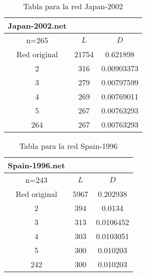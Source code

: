 \begin{minipage}{0.5\textwidth}
  \begin{table}[H]
    \caption{Tabla para la red Japan-2002}
    \begin{tabular}{ccc}
      Japan-2002.net & & \\
      \hline
      n=265              &   $L$ &   $D$ \\
      \hline
      Red original &               21754 & 0.621898   \\
      2            &                 316 & 0.00903373 \\
      3            &                 279 & 0.00797599 \\
      4            &                 269 & 0.00769011 \\
      5            &                 267 & 0.00763293 \\
      264          &                 267 & 0.00763293 \\
      \hline
    \end{tabular}
    \label{jap}
  \end{table}
\end{minipage}
\begin{minipage}{0.5\textwidth}
  \begin{table}[H]
    \caption{Tabla para la red Spain-1996}
    \begin{tabular}{ccc}
      Spain-1996.net & & \\
      \hline
      n=243              &   $L$ &   $D$ \\
      \hline
      Red original &                5967 &  0.202938  \\
      2            &                 394 &  0.0134    \\
      3            &                 313 &  0.0106452 \\
      4            &                 303 &  0.0103051 \\
      5            &                 300 &  0.010203  \\
      242          &                 300 &  0.010203  \\
      \hline
    \end{tabular}
    \label{sp96}
  \end{table}  
\end{minipage}

